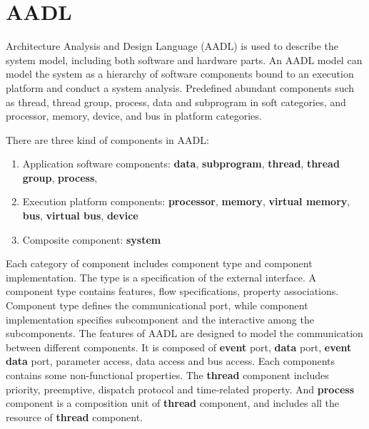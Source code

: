 
\section{AADL}

Architecture Analysis and Design Language (AADL) is used to describe the system model, including both software and hardware parts. An AADL model can model the system as a hierarchy of software components bound to an execution platform and conduct a system analysis. Predefined abundant components such as thread, thread group, process, data and subprogram in soft categories, and processor, memory, device, and bus in platform categories. 

There are three kind of components in AADL:
\begin{enumerate}
\item Application software components: \textbf{data}, \textbf{subprogram}, \textbf{thread}, \textbf{thread group}, \textbf{process}, 
\item Execution platform components: \textbf{processor}, \textbf{memory}, \textbf{virtual memory}, \textbf{bus}, \textbf{virtual bus}, \textbf{device}
\item Composite component: \textbf{system}
\end{enumerate}


Each category of component includes component type and component implementation. The type is a specification of the external interface. A component type contains features, flow specifications, property associations. Component type defines the communicational port, while component implementation specifies subcomponent and the interactive among the subcomponents. The features of AADL are designed to model the communication between different components. It is composed of \textbf{event} port, \textbf{data} port, \textbf{event data} port, parameter access, data access and bus access. Each components contains some non-functional properties. The \textbf{thread} component includes priority, preemptive, dispatch protocol and time-related property. And \textbf{process} component is a composition unit of \textbf{thread} component, and includes all the resource of \textbf{thread} component. 





